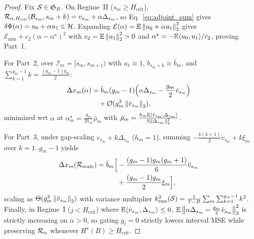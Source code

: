 \begin{proof}
Fix $\mathcal{S} \in \mathfrak{S}_B$. On Regime~II ($s_m \ge H_{\mathrm{crit}}$), $\mathcal{R}_{\alpha, H_{\mathrm{crit}}}(\mathcal{B}_{s_m}, s_m + k) = v_{s_m} + \alpha \Delta_{s_m}$, so Eq.~\eqref{eq:adjoint_sum} gives $\delta\Phi(\alpha) = u_0 + \alpha u_1 \in \mathcal{H}$. Expanding $\mathcal{E}(\alpha) = \mathbb{E}\left\lVert u_0 + \alpha u_1 \right\rVert_2^2$ gives $\mathcal{E}_{\min} + c_2(\alpha - \alpha^\star)^2$ with $c_2 = \mathbb{E}\left\lVert u_1 \right\rVert_2^2 > 0$ and $\alpha^\star = -\mathbb{E}\langle u_0, u_1\rangle / c_2$, proving Part~1.

For Part~2, over $\mathcal{I}_m = [s_m, s_{m+1})$ with $a_\ell \approx 1$, $b_{s_m+k} \approx \bar{b}_m$, and $\sum_{k=1}^{g_m-1} k = \frac{(g_m-1)g_m}{2}$:
\begin{equation}
\begin{aligned}
\Delta x_m(\alpha) &= \bar{b}_m(g_m - 1)\!\left(\alpha \Delta_{s_m} - \frac{g_m}{2}\dot{v}_{s_m}\right) \\
&\quad + \mathcal{O}(g_m^3 \left\lVert \ddot{v}_{s_m} \right\rVert_2),
\end{aligned}
\end{equation}
minimized wrt $\alpha$ at $\alpha_m^\star = \frac{g_m}{2h_m}\bar{\rho}_m$ with $\bar{\rho}_m = \frac{h_m \mathbb{E}\langle \dot{v}_{s_m}, \Delta_{s_m}\rangle}{\mathbb{E}\left\lVert \Delta_{s_m} \right\rVert_2^2}$.

For Part~3, under gap-scaling $v_{s_m} + k\Delta_{s_m}$ ($h_m=1$), summing $-\frac{k(k+1)}{2}\ddot{v}_{s_m} + k\xi_m$ over $k=1..g_m-1$ yields
\begin{equation}
\begin{aligned}
\Delta x_m(\mathcal{R}_{\mathrm{scale}}) = \bar{b}_m\Bigl[&-\frac{(g_m - 1)g_m(g_m + 1)}{6}\ddot{v}_{s_m} \\
&+ \frac{(g_m - 1)g_m}{2}\xi_m\Bigr],
\end{aligned}
\end{equation}
scaling as $\Theta(g_m^3 \left\lVert \ddot{v}_{s_m} \right\rVert_2)$ with variance multiplier $k_{\mathrm{rms}}^2(\mathcal{S}) = \frac{1}{T-B}\sum_m\sum_{k=1}^{g_m-1}k^2$. Finally, in Regime~I ($j < H_{\mathrm{crit}}$) where $\mathbb{E}\langle \dot{v}_{s_m}, \Delta_{s_m}\rangle \le 0$, $\mathbb{E}\left\lVert \alpha\Delta_{s_m} - \frac{g_m}{2}\dot{v}_{s_m} \right\rVert_2^2$ is strictly increasing on $\alpha > 0$, so gating $g_t = 0$ strictly lowers interval MSE while preserving $\mathcal{R}_\alpha$ whenever $H^\star(B) \ge H_{\mathrm{crit}}$.
\end{proof}
